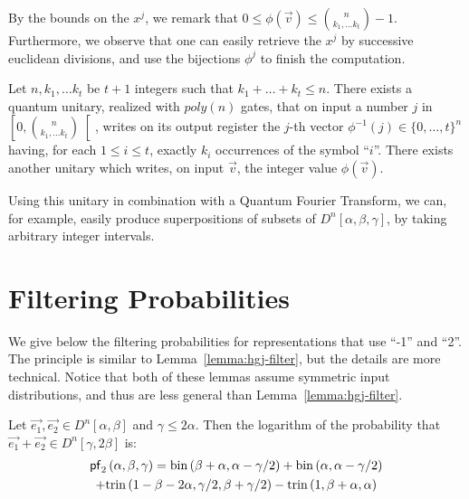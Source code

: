 $$  $$
By the bounds on the $x^j$, we remark that $0 \leq \phi(\vec{v}) \leq {n \choose k_1, \ldots k_t } - 1$. Furthermore, we observe that one can easily retrieve the $x^j$ by successive euclidean divisions, and use the bijections $\phi^j$ to finish the computation.



\begin{lemma}\label{lemma:representation-bijection}
Let $n, k_1, \ldots k_t$ be $t +1$ integers such that $k_1 + \ldots + k_t \leq n$. There exists a quantum unitary, realized with $poly(n)$ gates, that on input a number $j$ in $\left[0, {n \choose {k_1, \ldots k_t}} \right[$, writes on its output register the $j$-th vector $\phi^{-1}(j) \in \{0, \ldots, t\}^n$ having, for each $1 \leq i \leq t$, exactly $k_i$ occurrences of the symbol ``$i$''. There exists another unitary which writes, on input $\vec{v}$, the integer value $\phi(\vec{v})$.
\end{lemma}

Using this unitary in combination with a Quantum Fourier Transform, we can, for example, easily produce superpositions of subsets of $D^n[\alpha, \beta, \gamma]$, by taking arbitrary integer intervals.


\section{Filtering Probabilities}
\label{appendix:filter}

We give below the filtering probabilities for representations that use ``-1'' and ``2''. The principle is similar to Lemma~\ref{lemma:hgj-filter}, but the details are more technical. Notice that both of these lemmas assume symmetric input distributions, and thus are less general than Lemma~\ref{lemma:hgj-filter}.

\begin{lemma}
\label{lemma:bcj-filter}
Let $\vec{e_1}, \vec{e_2} \in D^n[\alpha, \beta]$ and $\gamma \leq 2 \alpha$. Then the logarithm of the probability that $\vec{e_1} + \vec{e_2} \in D^n[\gamma, 2\beta]$ is:
 \begin{multline*}
 \mathsf{pf}_2 \left(\alpha, \beta, \gamma \right) = \mathrm{bin}\left(\beta+\alpha,\alpha-\gamma/2\right) + \mathrm{bin}\left(\alpha,\alpha-\gamma/2\right) \\+ \mathrm{trin}\left(1-\beta-2\alpha,\gamma/2,\beta+\gamma/2\right) - \mathrm{trin}\left(1,\beta+\alpha,\alpha\right) 
 \end{multline*}
 \end{lemma}

